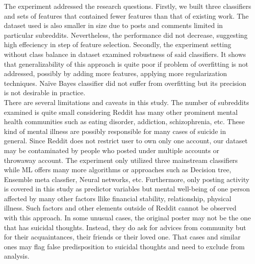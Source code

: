 The experiment addressed the research questions. Firstly, we built three classifiers and sets of features that contained fewer features than that of existing work. The dataset used is also smaller in size due to posts and comments limited in particular subreddits. Nevertheless, the performance did not decrease, suggesting high effeciency in step of feature selection. Secondly, the experiment setting without class balance in dataset examined robustness of said classifiers. It shows that generalizability of this approach is quite poor if problem of overfitting is not addressed, possibly by adding more features, applying more regularization techniques. Na\"ive Bayes classifier did not suffer from overfitting but its precision is not desirable in practice.\\
There are several limitations and caveats in this study. The number of subreddits examined is quite small considering Reddit has many other prominent mental health communities such as eating disorder, addiction, schizophrenia, etc. These kind of mental illness are possibly responsible for many cases of suicide in general. Since Reddit does not restrict user to own only one account, our dataset may be contaminated by people who posted under multiple accounts or throwaway account. The experiment only utilized three mainstream classifiers while ML offers many more algorithms or approaches such as Decision tree,  Ensemble meta classfier, Neural networks, etc. Furthermore, only posting activity is covered in this study as predictor variables but mental well-being of one person affected by many other factors llike financial stability, relationship, physical illness. Such factors and other elements outside of Reddit cannot be observed with this approach. In some unusual cases, the original poster may not be the one that has suicidal thoughts. Instead, they do ask for advices from community but for their acquaintances, their friends or their loved one. That cases and similar ones may flag false predisposition to suicidal thoughts and need to exclude from analysis.\\
\cite{cavanagh_carson_sharpe_lawrie_2003}
